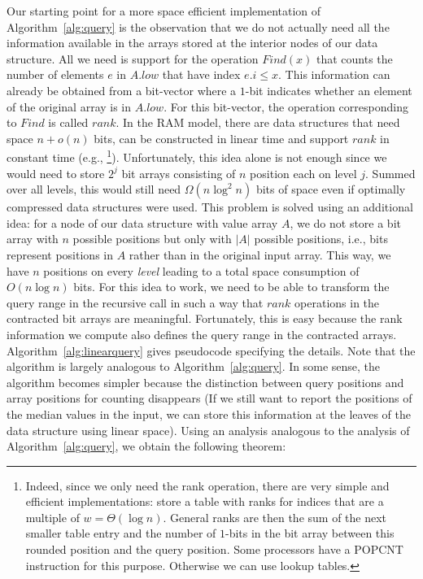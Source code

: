 \documentclass[a4paper,10pt]{article}
\newcommand{\Id}[1]{\ensuremath{\mathit{#1}}}
\begin{document}
Our starting point for a more space efficient implementation of
Algorithm~\ref{alg:query} is the observation that we do not actually
need all the information available in the arrays stored at the
interior nodes of our data structure. All we need is support for the
operation \Id{Find}$(x)$ that counts the number of elements $e$ in
$A.low$ that have index $e.i\leq x$.  This information can already be
obtained from a bit-vector where a $1$-bit indicates whether an
element of the original array  is in $A.low$. For this bit-vector, the operation
corresponding to \Id{Find} is called \Id{rank}.  In the RAM model, there are data
structures that need space $n+o(n)$ bits,  can be constructed in
linear time and support \Id{rank} in constant time (e.g.,
\cite{Cla88,OkaSad06}\footnote{Indeed, since we only need the rank operation, there are very simple and efficient implementations: store a table with ranks for
indices that are a multiple of $w=\Theta(\log n)$. General ranks are then the sum of the next smaller table entry and the number of $1$-bits in the bit array between this rounded position and
the query position. Some processors have a POPCNT instruction for this purpose. Otherwise we can use lookup tables.}).  Unfortunately, this idea alone is not enough
since we would need to store $2^j$ bit arrays consisting of $n$
position each on level $j$.  Summed over all levels, this would still
need $\Omega(n\log^2 n)$ bits of space even if optimally compressed data
structures were used.  This problem is solved using an additional
idea: for a node  of our data structure  with value array $A$, we do not store a bit
array with $n$ possible positions but only with $|A|$ possible
positions, i.e., bits represent positions in $A$ rather than in the
original input array. This way, we have $n$ positions on every
\emph{level} leading to a total space consumption of $O(n\log n)$ 
bits.  For this idea to work, we need to be able to transform the
query range in the recursive call in such a way that \Id{rank}
operations in the contracted bit arrays are meaningful. Fortunately,
this is easy because the rank information we compute also defines the
query range in the contracted arrays. Algorithm~\ref{alg:linearquery}
gives pseudocode specifying the details.  Note that the algorithm is
largely analogous to Algorithm~\ref{alg:query}.  In some sense, the
algorithm becomes simpler because the distinction between query
positions and array positions for counting disappears (If we still
want to report the positions of the median values in the input, we can
store this information at the leaves of the data structure using
linear space). Using an analysis analogous to the analysis of
Algorithm~\ref{alg:query}, we obtain the following theorem:
\end{document}
